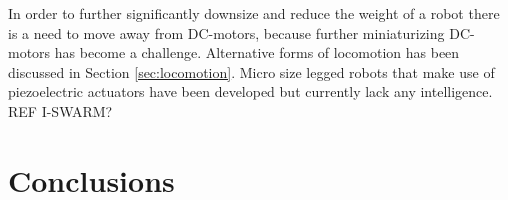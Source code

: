 
In order to further significantly downsize and reduce the weight of a robot there is a need to move away from DC-motors, because further miniaturizing DC-motors has become a challenge.
Alternative forms of locomotion has been discussed in Section \ref{sec:locomotion}.
Micro size legged robots that make use of piezoelectric actuators have been developed but currently lack any intelligence. REF I-SWARM?



\section{Conclusions}
